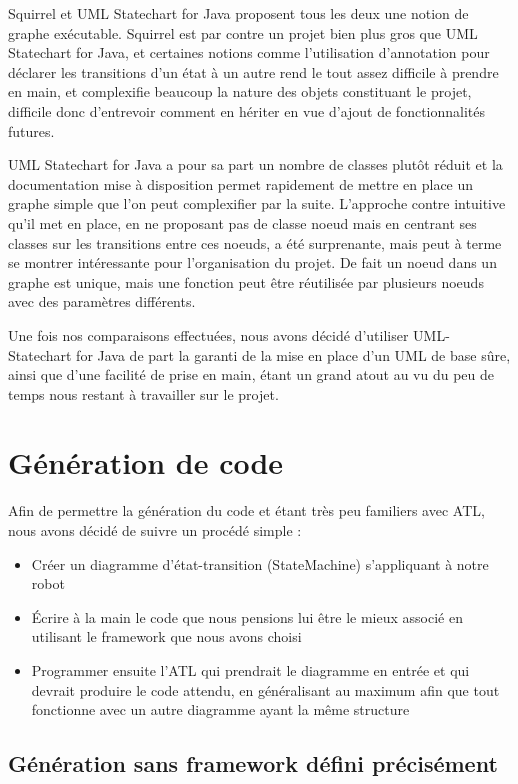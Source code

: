 \documentclass[french, 12pt, a4paper]{article}
\begin{document}
        Squirrel et UML Statechart for Java proposent tous les deux une notion de graphe exécutable. Squirrel est par contre un projet bien plus gros que UML Statechart for Java, et certaines notions comme l'utilisation d'annotation pour déclarer les transitions d'un état à un autre rend le tout assez difficile à prendre en main, et complexifie beaucoup la nature des objets constituant le projet, difficile donc d'entrevoir comment en hériter en vue d'ajout de fonctionnalités futures.
        
        UML Statechart for Java a pour sa part un nombre de classes plutôt réduit et la documentation mise à disposition permet rapidement de mettre en place un graphe simple que l'on peut complexifier par la suite. L'approche contre intuitive qu'il met en place, en ne proposant pas de classe noeud mais en centrant ses classes sur les transitions entre ces noeuds, a été surprenante, mais peut à terme se montrer intéressante pour l'organisation du projet. De fait un noeud dans un graphe est unique, mais une fonction peut être réutilisée par plusieurs noeuds avec des paramètres différents.

    \bigskip

    Une fois nos comparaisons effectuées, nous avons décidé d'utiliser UML-Statechart for Java de part la garanti de la mise en place d'un UML de base sûre, ainsi que d'une facilité de prise en main, étant un grand atout au vu du peu de temps nous restant à travailler sur le projet.

\section{Génération de code}
Afin de permettre la génération du code et étant très peu familiers avec ATL, nous avons décidé de suivre un procédé simple : 
    \begin{itemize}
        \item Créer un diagramme d'état-transition (StateMachine) s'appliquant à notre robot
        \item Écrire à la main le code que nous pensions lui être le mieux associé en utilisant le framework que nous avons choisi
        \item Programmer ensuite l'ATL qui prendrait le diagramme en entrée et qui devrait produire le code attendu, en généralisant au maximum afin que tout fonctionne avec un autre diagramme ayant la même structure
    \end{itemize}
    
    \subsection{Génération sans framework défini précisément}
    
\end{document}

